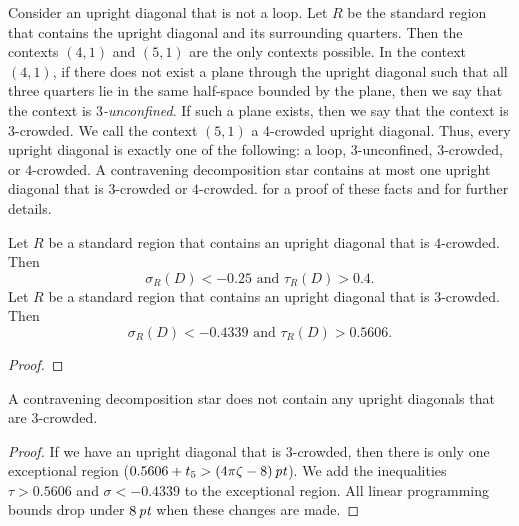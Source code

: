 \begin{definition}
Consider an upright diagonal that is not a loop. Let $R$ be the
standard region that contains the upright diagonal and its
surrounding quarters.  Then the contexts $(4,1)$ and $(5,1)$ are
the only contexts possible.  In the context $(4,1)$, if there does
not exist a plane through the upright diagonal such that all three
quarters lie in the same half-space bounded by the plane, then we
say that the context is {\it $3$-unconfined}.  If such a plane
exists, then we say that the context is $3$-crowded.  We call the
context $(5,1)$ a $4$-crowded upright diagonal.  Thus, every
upright diagonal is exactly one of the following: a loop,
$3$-unconfined, $3$-crowded, or $4$-crowded.  A contravening
decomposition star contains at most one upright diagonal that is
$3$-crowded or $4$-crowded.   
 for a proof of
these facts and for further details.
%
\end{definition}

\begin{lemma}  Let $R$ be a standard region that contains an
upright diagonal that is $4$-crowded.  Then
    $$\sigma_R(D) < -0.25\text{ and\ \  }\tau_R(D) > 0.4.$$
Let $R$ be a standard region that contains an upright diagonal
that is $3$-crowded.  Then
    $$\sigma_R(D) < -0.4339\text{ and\ \  }\tau_R(D) > 0.5606.$$
\end{lemma}

\begin{proof} 
\end{proof}

\begin{lemma}  A contravening decomposition star does not contain
any upright diagonals that are $3$-crowded.
\end{lemma}

\begin{proof}
If we have an upright diagonal that is $3$-crowded, then there is
only one exceptional region ($0.5606+t_5>(4\pi\zeta-8)\,\hbox{\it pt}$).
%
%
We add the inequalities $\tau>0.5606$ and $\sigma< -0.4339$ to the
exceptional region. All linear programming bounds drop under
$8\,\hbox{\it pt}$ when these changes are made.
\end{proof}

